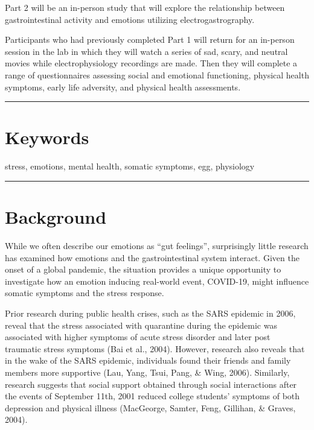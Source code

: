 \documentclass[]{book}
\begin{document}
Part 2 will be an in-person study that will explore the relationship between gastrointestinal activity and emotions utilizing electrogastrography.

Participants who had previously completed Part 1 will return for an in-person session in the lab in which they will watch a series of sad, scary, and neutral movies while electrophysiology recordings are made. Then they will complete a range of questionnaires assessing social and emotional functioning, physical health symptoms, early life adversity, and physical health assessments.

\begin{center}\rule{0.5\linewidth}{0.5pt}\end{center}

\hypertarget{keywords}{%
\section{Keywords}\label{keywords}}

stress, emotions, mental health, somatic symptoms, egg, physiology

\begin{center}\rule{0.5\linewidth}{0.5pt}\end{center}

\hypertarget{background}{%
\section{Background}\label{background}}

While we often describe our emotions as ``gut feelings'', surprisingly little research has examined how emotions and the gastrointestinal system interact. Given the onset of a global pandemic, the situation provides a unique opportunity to investigate how an emotion inducing real-world event, COVID-19, might influence somatic symptoms and the stress response.

Prior research during public health crises, such as the SARS epidemic in 2006, reveal that the stress associated with quarantine during the epidemic was associated with higher symptoms of acute stress disorder and later post traumatic stress symptoms (Bai et al., 2004). However, research also reveals that in the wake of the SARS epidemic, individuals found their friends and family members more supportive (Lau, Yang, Tsui, Pang, \& Wing, 2006). Similarly, research suggests that social support obtained through social interactions after the events of September 11th, 2001 reduced college students' symptoms of both depression and physical illness (MacGeorge, Samter, Feng, Gillihan, \& Graves, 2004).
\end{document}
